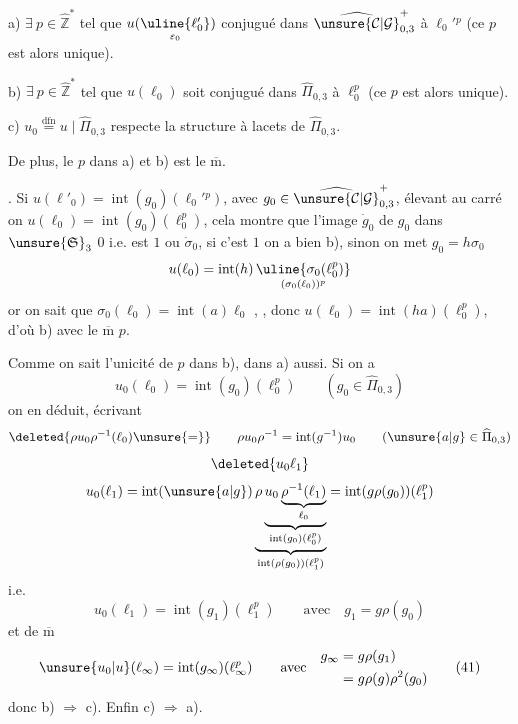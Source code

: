 a) $\exists\ p\in\widehat{\mathbb Z}^{*}$ tel que
$u(\underset{\varepsilon_0}{\uline{\ell'_0}})$ conjugué dans
$\widehat{\unsure{\mathcal C|\mathcal G}}_{0,3}^{+}$ à $\ell_0'{}^p$
(ce $p$ est alors unique).

b) $\exists\ p\in\widehat{\mathbb Z}^{*}$ tel que $u(\ell_0)$ soit conjugué dans
$\widehat\Pi_{0,3}$ à $\ell_0^p$ (ce $p$ est alors unique).

c) $u_0\overset{\mathrm{dfn}}{=}u\mid\widehat\Pi_{0,3}$ respecte la structure à lacets de $\widehat\Pi_{0,3}$.

De plus, le $p$ dans a) et b) est le $\overline{\mathrm m}$.

\uline{}. Si $u(\ell'_0)=\operatorname{int}(g_0)(\ell_0'{}^p)$, avec
$g_0\in\widehat{\unsure{\mathcal C|\mathcal G}}_{0,3}^{+}$,
élevant au carré on  $u(\ell_0)=\operatorname{int}(g_0)(\ell_0^p)$,
cela montre que l'image $\dot g_0$ de $g_0$ dans $\unsure{\mathfrak S}_3$
 $0$ i.e. est  $1$ ou $\dot\sigma_0$,
 si c'est $1$ on a bien b), sinon on met
$g_0=h\sigma_0$ 
\[
u(\ell_0)=\operatorname{int}(h)\,
\underset{(\sigma_0(\ell_0))^p}{\uline{\sigma_0(\ell_0^p)}}
\]
or on sait que $\sigma_0(\ell_0)=\operatorname{int}(a)\ell_0$
,
,
donc $u(\ell_0)=\operatorname{int}(ha)(\ell_0^p)$, d'où b) avec le $\overline{\mathrm m}$ $p$.


Comme on sait l'unicité de $p$ dans b), dans a) aussi. Si on a
\begin{equation}
u_0(\ell_0)=\operatorname{int}(g_0)(\ell_0^p)
\qquad (g_0\in\widehat\Pi_{0,3})
\tag{39}
\end{equation}
on en déduit, écrivant
\[
\deleted{\rho u_0\rho^{-1}(\ell_0)\unsure{=}}
\qquad
\rho u_0\rho^{-1}=\operatorname{int}(g^{-1})u_0
\qquad (\unsure{a|g}\in\widehat\Pi_{0,3})
\]
\[
\deleted{u_0 \ell_1}
\]
\[
u_0(\ell_1)=\operatorname{int}(\unsure{a|g})
\underbrace{\rho\underbrace{u_0\underbrace{\rho^{-1}(\ell_1)}_{\ell_0}}_{
\operatorname{int}(g_0)(\ell_0^p)}}_{
\operatorname{int}(\rho(g_0))(\ell_1^p)}
=\operatorname{int}(g\rho(g_0))(\ell_1^p)
\]
i.e.
\begin{equation}
u_0(\ell_1)=\operatorname{int}(g_1)(\ell_1^p)
\qquad\text{avec}\quad g_1=g\rho(g_0)
\tag{40}
\end{equation}
et de $\overline{\mathrm m}$
\begin{equation}
\unsure{u_0|u}(\ell_\infty)=\operatorname{int}(g_\infty)(\ell_\infty^p)
\qquad\text{avec}\quad
\begin{aligned}
g_\infty&=g\rho(g_1)\\
&=g\rho(g)\rho^2(g_0)
\end{aligned}
\tag{41}
\end{equation}
donc b) $\Rightarrow$ c). Enfin  c) $\Rightarrow$ a).

